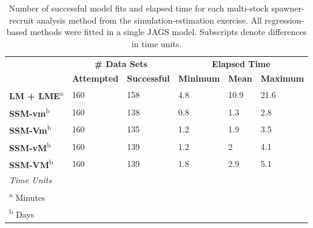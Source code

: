 \documentclass[12pt,]{book}
\theoremstyle{definition}
\theoremstyle{definition}
\theoremstyle{definition}
\theoremstyle{remark}
\begin{document}
\begin{table}

\caption{\label{tab:model-run-time-table}Number of successful model fits and elapsed time for each multi-stock spawner-recruit analysis method from the simulation-estimation exercise. All regression-based methods were fitted in a single JAGS model. Subscripts denote differences in time units.}
\centering
\begin{tabular}[t]{llllll}
\toprule
\multicolumn{1}{c}{\bfseries } & \multicolumn{2}{c}{\bfseries \# Data Sets} & \multicolumn{3}{c}{\bfseries Elapsed Time} \\
\cmidrule(l{2pt}r{2pt}){2-3} \cmidrule(l{2pt}r{2pt}){4-6}
\textbf{} & \textbf{Attempted} & \textbf{Successful} & \textbf{Minimum} & \textbf{Mean} & \textbf{Maximum}\\
\midrule
\textbf{LM + LME}\textsuperscript{a} & 160 & 158 & 4.8 & 10.9 & 21.6\\
\textbf{SSM-vm}\textsuperscript{b} & 160 & 138 & 0.8 & 1.3 & 2.8\\
\textbf{SSM-Vm}\textsuperscript{b} & 160 & 135 & 1.2 & 1.9 & 3.5\\
\textbf{SSM-vM}\textsuperscript{b} & 160 & 139 & 1.2 & 2 & 4.1\\
\textbf{SSM-VM}\textsuperscript{b} & 160 & 139 & 1.8 & 2.9 & 5.1\\
\bottomrule
\multicolumn{6}{l}{\textit{Time Units}}\\
\multicolumn{6}{l}{\textsuperscript{a} Minutes}\\
\multicolumn{6}{l}{\textsuperscript{b} Days}\\
\end{tabular}
\end{table}

\clearpage
\end{document}
